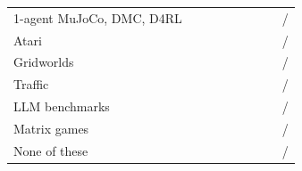 \documentclass[sigconf,anonymous]{aamas}
\begin{document}
\begin{table}[t]
\begin{tabular}{@{}lrrrrrrrr@{}}
1-agent MuJoCo, DMC, D4RL & \nPenvSingleagentMujocoDmcDrlPapers{} & \nPenvSingleagentMujocoDmcDrlStateK{} & \nPenvSingleagentMujocoDmcDrlModalK{} & \nPenvSingleagentMujocoDmcDrlStateSeeds{} & \nPenvSingleagentMujocoDmcDrlModalSeeds{} & \nPenvSingleagentMujocoDmcDrlResolution{} & \nPenvSingleagentMujocoDmcDrlFail{} & \nPenvSingleagentMujocoDmcDrlTestable{}/\nPenvSingleagentMujocoDmcDrlTestablePapers{} \\
Atari & \nPenvAtariPapers{} & \nPenvAtariStateK{} & \nPenvAtariModalK{} & \nPenvAtariStateSeeds{} & \nPenvAtariModalSeeds{} & \nPenvAtariResolution{} & \nPenvAtariFail{} & \nPenvAtariTestable{}/\nPenvAtariTestablePapers{} \\
Gridworlds & \nPenvGridworldsPapers{} & \nPenvGridworldsStateK{} & \nPenvGridworldsModalK{} & \nPenvGridworldsStateSeeds{} & \nPenvGridworldsModalSeeds{} & \nPenvGridworldsResolution{} & \nPenvGridworldsFail{} & \nPenvGridworldsTestable{}/\nPenvGridworldsTestablePapers{} \\
Traffic & \nPenvTrafficPapers{} & \nPenvTrafficStateK{} & \nPenvTrafficModalK{} & \nPenvTrafficStateSeeds{} & \nPenvTrafficModalSeeds{} & \nPenvTrafficResolution{} & \nPenvTrafficFail{} & \nPenvTrafficTestable{}/\nPenvTrafficTestablePapers{} \\
LLM benchmarks & \nPenvLlmBenchmarksPapers{} & \nPenvLlmBenchmarksStateK{} & \nPenvLlmBenchmarksModalK{} & \nPenvLlmBenchmarksStateSeeds{} & \nPenvLlmBenchmarksModalSeeds{} & \nPenvLlmBenchmarksResolution{} & \nPenvLlmBenchmarksFail{} & \nPenvLlmBenchmarksTestable{}/\nPenvLlmBenchmarksTestablePapers{} \\
Matrix games & \nPenvMatrixAndNormalformGamesPapers{} & \nPenvMatrixAndNormalformGamesStateK{} & \nPenvMatrixAndNormalformGamesModalK{} & \nPenvMatrixAndNormalformGamesStateSeeds{} & \nPenvMatrixAndNormalformGamesModalSeeds{} & \nPenvMatrixAndNormalformGamesResolution{} & \nPenvMatrixAndNormalformGamesFail{} & \nPenvMatrixAndNormalformGamesTestable{}/\nPenvMatrixAndNormalformGamesTestablePapers{} \\
None of these & \nPenvOtherOrNoneOfThesePapers{} & \nPenvOtherOrNoneOfTheseStateK{} & \nPenvOtherOrNoneOfTheseModalK{} & \nPenvOtherOrNoneOfTheseStateSeeds{} & \nPenvOtherOrNoneOfTheseModalSeeds{} & \nPenvOtherOrNoneOfTheseResolution{} & \nPenvOtherOrNoneOfTheseFail{} & \nPenvOtherOrNoneOfTheseTestable{}/\nPenvOtherOrNoneOfTheseTestablePapers{} \\
\bottomrule
\end{tabular}
\end{table}
\end{document}
